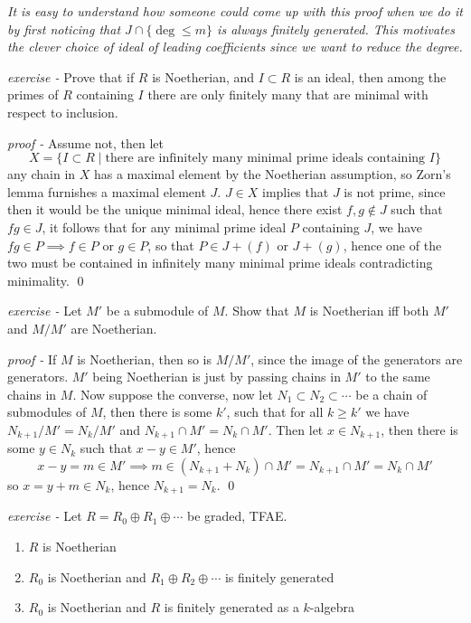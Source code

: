 \documentclass[11pt]{article}
\theoremstyle{definition}
\newcommand{\set}[1]{\{#1\}}
\newcommand{\tor}{\text{ or }}
\begin{document}
    \emph{It is easy to understand how someone could come up with this proof when we do it by first noticing that \(J \cap \set{\deg \leq m}\) is always finitely generated.
    This motivates the clever choice of ideal of leading coefficients since we want to reduce the degree.}

    \emph{exercise - } Prove that if \(R\) is Noetherian, and \(I \subset R\) is an ideal, then among the primes of \(R\) containing \(I\) there are only finitely many that are minimal with respect to inclusion.

    \emph{proof - } Assume not, then let 
    \[X = \set{I \subset R \mid \text{there are infinitely many minimal prime ideals containing } I}\]
    any chain in \(X\) has a maximal element by the Noetherian assumption, so Zorn's lemma furnishes a maximal element \(J\). \(J \in X\) implies that \(J\) is not prime, since then it would be the unique minimal ideal, hence there exist \(f,g \not \in J\) such that \(fg \in J\), it follows that for any minimal prime ideal \(P\) containing \(J\), we have \(fg \in P \implies f \in P \tor g \in P\), so that \(P \in J + (f) \tor J + (g)\), hence one of the two must be contained in infinitely many minimal prime ideals contradicting minimality. \qed

    \emph{exercise - }  Let \(M'\) be a submodule of \(M\). Show that \(M\) is Noetherian
    iff both \(M'\) and \(M / M'\) are Noetherian.

    \emph{proof - } If \(M\) is Noetherian, then so is \(M/M'\), since the image of the generators are generators. \(M'\) being Noetherian is just by passing chains in \(M'\) to the same chains in \(M\). Now suppose the converse, now let \(N_1 \subset N_2 \subset \cdots\) be a chain of submodules of \(M\), then there is some \(k'\), such that for all \(k \geq k'\) we have \(N_{k+1}/M' = N_k/M'\) and \(N_{k+1}\cap M' = N_k\cap M'\). Then let \(x \in N_{k+1}\), then there is some \(y \in N_k\) such that \(x-y \in M'\), hence
    \[x - y =m \in M' \implies m \in (N_{k+1} + N_k)\cap M' = N_{k+1} \cap M' = N_k \cap M'\]
    so \(x = y + m \in N_k\), hence \(N_{k+1} = N_k\). \qed

    \emph{exercise - } Let \(R = R_0 \oplus R_1 \oplus \cdots\) be graded, TFAE.
    \begin{enumerate}
        \item \(R\) is Noetherian
        \item \(R_0\) is Noetherian and \(R_1 \oplus R_2 \oplus \cdots\) is finitely generated
        \item \(R_0\) is Noetherian and \(R\) is finitely generated as a \(k\)-algebra
    \end{enumerate}
\end{document}
